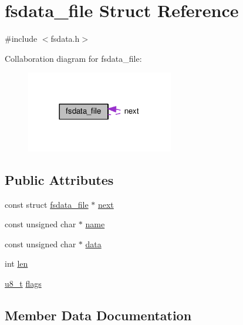 \hypertarget{structfsdata__file}{}\section{fsdata\+\_\+file Struct Reference}
\label{structfsdata__file}


{\ttfamily \#include $<$fsdata.\+h$>$}



Collaboration diagram for fsdata\+\_\+file\+:
\nopagebreak
\begin{figure}[H]
\begin{center}
\leavevmode
\includegraphics[width=182pt]{structfsdata__file__coll__graph}
\end{center}
\end{figure}
\subsection*{Public Attributes}
\begin{DoxyCompactItemize}
\item 
const struct \hyperlink{structfsdata__file}{fsdata\+\_\+file} $\ast$ \hyperlink{structfsdata__file_a0fc472e6f90ff7abb10941fee5aadde6}{next}
\item 
const unsigned char $\ast$ \hyperlink{structfsdata__file_ae085a826b4ea40cac79269ee139918e8}{name}
\item 
const unsigned char $\ast$ \hyperlink{structfsdata__file_af06621c7ab808e8c1aa0988f15c60dd5}{data}
\item 
int \hyperlink{structfsdata__file_a88cb83eb2c7095fde099fe0d5dc8e7f6}{len}
\item 
\hyperlink{group__compiler__abstraction_ga4caecabca98b43919dd11be1c0d4cd8e}{u8\+\_\+t} \hyperlink{structfsdata__file_a8e3c2a4d5d7a06ec4295560b31785851}{flags}
\end{DoxyCompactItemize}


\subsection{Member Data Documentation}
\mbox{\label{structfsdata__file_af06621c7ab808e8c1aa0988f15c60dd5}} 
